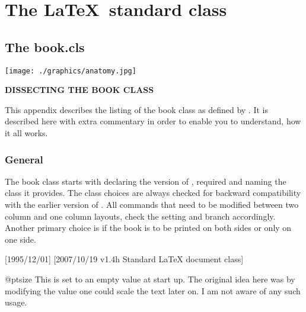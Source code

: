 \part{The \LaTeX\ standard class}
\parindent0pt
\setlength\columnsep{2em}
\def\Paragraph#1{{\bfseries #1}\quad}
\chapter{The book.cls}
\label{ch:bookclass}


\clearpage

\texttt{[image: ./graphics/anatomy.jpg]}

\vspace{2\baselineskip}

\textbf{\Large DISSECTING THE BOOK CLASS}
\thispagestyle{plain}
\begin{multicols}{2}
This appendix describes the listing of the book class as defined by \latexe. It is described here with extra commentary in order to enable you to understand, how it all works.

\lipsum[1-3]
\end{multicols}

\section{General}
\pagestyle{headings}

The book class starts with declaring the version of \latex, required
and naming the class it provides. The class choices are always checked for backward compatibility with the earlier version of \latex. All commands that need to be modified between two column and one column layouts, check the setting and branch accordingly. Another primary choice is if the book is to be printed on both sides or only on one side.


\begin{teX}
[1995/12/01]
              [2007/10/19 v1.4h
 Standard LaTeX document class]
\end{teX}

\begin{docCommand}{@ptsize} { }
This is set to an empty value at start up. The original idea here was by modifying the value one could scale the
text later on. I am not aware of any such usage.
\end{docCommand}

